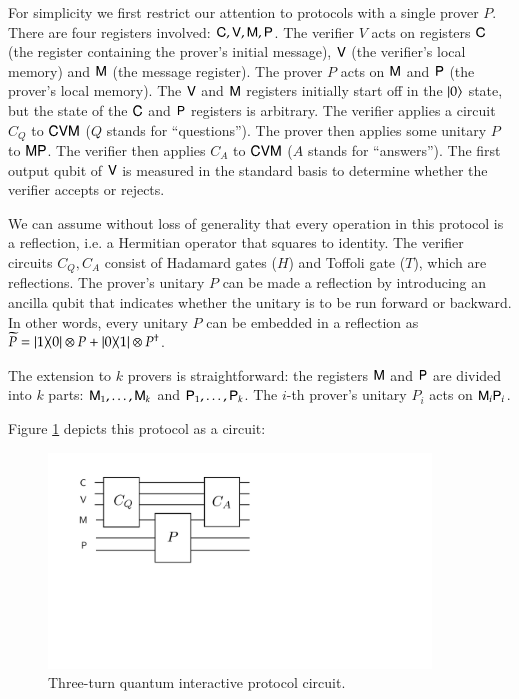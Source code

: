 For simplicity we first restrict our attention to protocols with a single prover $P$. There are four registers involved: ${\mathsf{C}}, {\mathsf{V}}, {\mathsf{M}}, {\mathsf{P}}$. The verifier $V$ acts on registers ${\mathsf{C}}$ (the register containing the prover's initial message), ${\mathsf{V}}$ (the verifier's local memory) and ${\mathsf{M}}$ (the message register). The prover $P$ acts on ${\mathsf{M}}$ and ${\mathsf{P}}$ (the prover's local memory). The ${\mathsf{V}}$ and ${\mathsf{M}}$ registers initially start off in the $|0\rangle$ state, but the state of the ${\mathsf{C}}$ and ${\mathsf{P}}$ registers is arbitrary. The verifier applies a circuit $C_Q$ to ${\mathsf{C}} {\mathsf{V}} {\mathsf{M}}$ ($Q$ stands for ``questions''). The prover then applies some unitary $P$ to ${\mathsf{M}} {\mathsf{P}}$. The verifier then applies $C_A$ to ${\mathsf{C}} {\mathsf{V}} {\mathsf{M}}$ ($A$ stands for ``answers''). The first output qubit of ${\mathsf{V}}$ is measured in the standard basis to determine whether the verifier accepts or rejects.

We can assume without loss of generality that every operation in this protocol is a reflection, i.e. a Hermitian operator that squares to identity. The verifier circuits $C_Q,C_A$ consist of Hadamard gates ($H$) and Toffoli gate ($T$), which are reflections. The prover's unitary $P$ can be made a reflection by introducing an ancilla qubit that indicates whether the unitary is to be run forward or backward. In other words, every unitary $P$ can be embedded in a reflection as $\widetilde{P} = |1\rangle\! \langle 0| \otimes P + |0\rangle\! \langle 1| \otimes P^\dagger$. 

The extension to $k$ provers is straightforward: the registers ${\mathsf{M}}$ and ${\mathsf{P}}$ are divided into $k$ parts: ${\mathsf{M}}_1,\ldots,{\mathsf{M}}_k$ and ${\mathsf{P}}_1,\ldots,{\mathsf{P}}_k$. The $i$-th prover's unitary $P_i$ acts on ${\mathsf{M}}_i {\mathsf{P}}_i$. 

Figure \ref{fig:qip} depicts this protocol as a circuit:

\begin{figure}[H]
\begin{center}
\includegraphics[width=4in]{graphics/qip3.pdf}
\end{center}
\caption{Three-turn quantum interactive protocol circuit.}
\label{fig:qip}
\end{figure}

